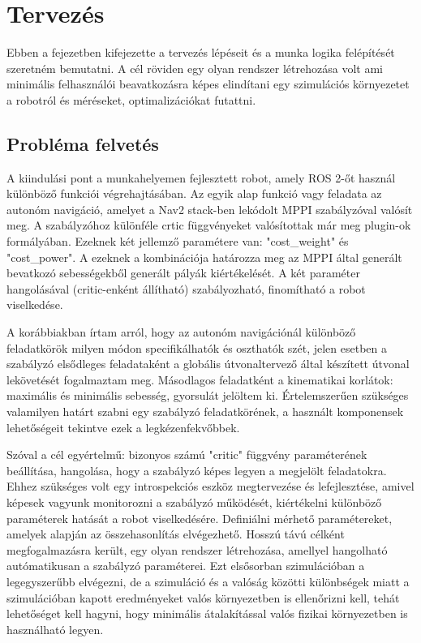 \chapter{Tervezés}
Ebben a fejezetben kifejezette a tervezés lépéseit és a munka logika felépítését szeretném bemutatni. A cél röviden egy olyan rendszer létrehozása volt ami minimális felhasználói beavatkozásra képes elindítani egy szimulációs környezetet a robotról és méréseket, optimalizációkat futattni.

\section{Probléma felvetés}
A kiindulási pont a munkahelyemen fejlesztett robot, amely ROS 2-őt használ különböző funkciói végrehajtásában. Az egyik alap funkció vagy feladata az autonóm navigáció, amelyet a Nav2 stack-ben lekódolt MPPI szabályzóval valósít meg. A szabályzóhoz különféle crtic függvényeket valósítottak már meg plugin-ok formályában. Ezeknek két jellemző paramétere van: "cost_weight" és "cost_power". A ezeknek a kombinációja határozza meg az MPPI által generált bevatkozó sebességekből generált pályák kiértékelését. A két paraméter hangolásával (critic-enként állítható) szabályozható, finomítható a robot viselkedése.

A korábbiakban írtam arról, hogy az autonóm navigációnál különböző feladatkörök milyen módon specifikálhatók és oszthatók szét, jelen esetben a szabályzó elsődleges feladataként a globális útvonaltervező által készített útvonal lekövetését fogalmaztam meg. Másodlagos feladatként a kinematikai korlátok: maximális és minimális sebesség, gyorsulát jelöltem ki. Értelemszerűen szükséges valamilyen határt szabni egy szabályzó feladatkörének, a használt komponensek lehetőségeit tekintve ezek a legkézenfekvőbbek.

Szóval a cél egyértelmű: bizonyos számú "critic" függvény paraméterének beállítása, hangolása, hogy a szabályzó képes legyen a megjelölt feladatokra. Ehhez szükséges volt egy introspekciós eszköz megtervezése és lefejlesztése, amivel képesek vagyunk monitorozni a szabályzó működését, kiértékelni különböző paraméterek hatását a robot viselkedésére. Definiálni mérhető paramétereket, amelyek alapján az összehasonlítás elvégezhető. Hosszú távú célként megfogalmazásra került, egy olyan rendszer létrehozása, amellyel hangolható autómatikusan a szabályzó paraméterei. Ezt elsősorban szimulációban a legegyszerűbb elvégezni, de a szimuláció és a valóság közötti különbségek miatt a szimulációban kapott eredményeket valós környezetben is ellenőrizni kell, tehát lehetőséget kell hagyni, hogy minimális átalakítással valós fizikai környezetben is használható legyen.

